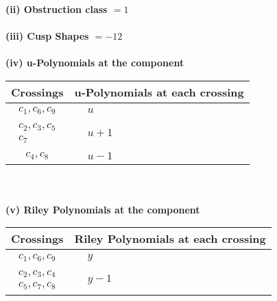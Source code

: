 \documentclass[1p]{elsarticle_modified}
\theoremstyle{definition}
\begin{document}
\flushleft \textbf{(ii) Obstruction class $= 1$}\\~\\
\flushleft \textbf{(iii) Cusp Shapes $= -12$}\\~\\
\newpage\renewcommand{\arraystretch}{1}
\flushleft \textbf{(iv) u-Polynomials at the component}\newline \\
\begin{tabular}{m{50pt}|m{274pt}}
Crossings & \hspace{64pt}u-Polynomials at each crossing \\
\hline $$\begin{aligned}c_{1},c_{6},c_{9}\end{aligned}$$&$\begin{aligned}
&u
\end{aligned}$\\
\hline $$\begin{aligned}c_{2},c_{3},c_{5}\\c_{7}\end{aligned}$$&$\begin{aligned}
&u+1
\end{aligned}$\\
\hline $$\begin{aligned}c_{4},c_{8}\end{aligned}$$&$\begin{aligned}
&u-1
\end{aligned}$\\
\hline
\end{tabular}\\~\\
\newpage\renewcommand{\arraystretch}{1}
\flushleft \textbf{(v) Riley Polynomials at the component}\newline \\
\begin{tabular}{m{50pt}|m{274pt}}
Crossings & \hspace{64pt}Riley Polynomials at each crossing \\
\hline $$\begin{aligned}c_{1},c_{6},c_{9}\end{aligned}$$&$\begin{aligned}
&y
\end{aligned}$\\
\hline $$\begin{aligned}c_{2},c_{3},c_{4}\\c_{5},c_{7},c_{8}\end{aligned}$$&$\begin{aligned}
&y-1
\end{aligned}$\\
\hline
\end{tabular}\\~\\
\end{document}

